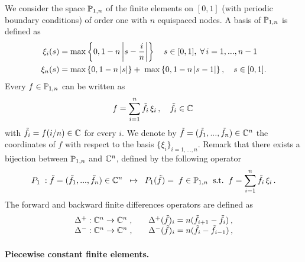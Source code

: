 We consider the  space $\mathbb{P}_{1,n}$ of the finite elements on $[0,1]$ (with periodic boundary conditions) of order one with $n$ equispaced nodes. 
A basis of $\mathbb{P}_{1,n}$ is defined as 
\begin{align*}
	\xi_i(s) &= \max\left\{0, 1- n\left| s- \frac{i}{n} \right|\right\} \quad  s\in [0,1],\;  \forall \, i= 1, ..., n-1 \\
	\xi_n(s) &= \max\left\{0, 1- n\left|s \right|\right\} + \;\max\left\{0, 1- n\left| s- 1 \right|\right\},  \quad s\in [0,1].
\end{align*}
Every  $f\in \mathbb{P}_{1,n}$ can be written as 
\begin{equation}\label{tangent-discrete}
	f=\sum_{i=1}^n\tilde{ f}_i \, \xi_i\,,\quad \tilde{f}_i\in\mathbb{C}\,
\end{equation}
with $\tilde{f}_i=f(i/n)\in\mathbb{C}$ for every $i$. We denote by $\tilde{f}=(\tilde{f}_1,..., \tilde{f}_n)\in \mathbb{C}^n$ the coordinates of $f$ with respect to  the basis $\{\xi_i\}_{i=1,...,n}$. 
Remark that there exists a bijection between $\mathbb{P}_{1,n}$ and $\mathbb{C}^n$, defined by the following operator
\begin{equation}\label{bijection}
	P_1\; : \tilde{f}=(\tilde{f}_1,..., \tilde{f}_n)\in \mathbb{C}^n 
	\;\;\mapsto\;\; 
	P_1(\tilde{f})=  \; f\in \mathbb{P}_{1,n} \mbox{\;\;s.t.\;\;} f=\sum_{i=1}^n\tilde{f}_i \, \xi_i\,.
\end{equation}
The forward and backward finite differences operators are defined as
\begin{equation}\label{delta}
\begin{array}{ll}
	\Delta^+: \mathbb{C}^n\rightarrow  \mathbb{C}^n \;,& \quad \Delta^+( \tilde{f})_i = n(\tilde{f}_{i+1}-\tilde{f}_i)\,,\\
	\Delta^-: \mathbb{C}^n\rightarrow  \mathbb{C}^n \;, &\quad \Delta^-( \tilde{f})_i = n(\tilde{f}_i -\tilde{f}_{i-1})\,,
\end{array}
\end{equation} 

\paragraph{Piecewise constant finite elements.}

\newcommand{\myI}{\mathbb{I}}

